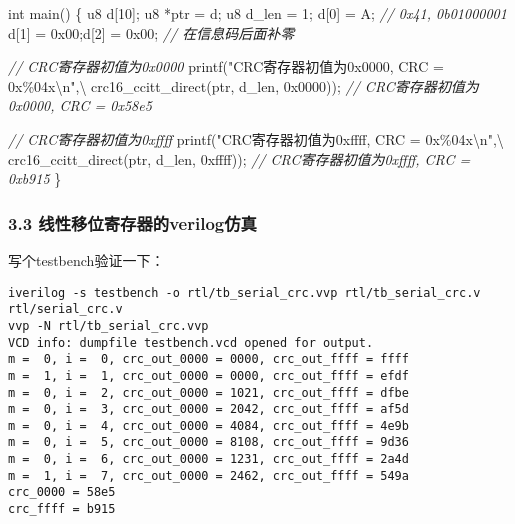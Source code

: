 \documentclass[
]{article}
\newenvironment{Shaded}{}{}
\newcommand{\BaseNTok}[1]{\textcolor[rgb]{0.25,0.63,0.44}{#1}}
\newcommand{\CharTok}[1]{\textcolor[rgb]{0.25,0.44,0.63}{#1}}
\newcommand{\CommentTok}[1]{\textcolor[rgb]{0.38,0.63,0.69}{\textit{#1}}}
\newcommand{\DataTypeTok}[1]{\textcolor[rgb]{0.56,0.13,0.00}{#1}}
\newcommand{\DecValTok}[1]{\textcolor[rgb]{0.25,0.63,0.44}{#1}}
\newcommand{\NormalTok}[1]{#1}
\newcommand{\SpecialCharTok}[1]{\textcolor[rgb]{0.25,0.44,0.63}{#1}}
\newcommand{\StringTok}[1]{\textcolor[rgb]{0.25,0.44,0.63}{#1}}
\begin{document}
\begin{Shaded}
\begin{Highlighting}[]
\DataTypeTok{int}\NormalTok{ main()}
\NormalTok{\{}
\NormalTok{	u8 d[}\DecValTok{10}\NormalTok{];}
\NormalTok{	u8 *ptr = d;}
\NormalTok{	u8 d\_len = }\DecValTok{1}\NormalTok{;}
\NormalTok{	d[}\DecValTok{0}\NormalTok{] = }\CharTok{\textquotesingle{}A\textquotesingle{}}\NormalTok{; }\CommentTok{// 0x41, 0b01000001}
\NormalTok{	d[}\DecValTok{1}\NormalTok{] = }\BaseNTok{0x00}\NormalTok{;d[}\DecValTok{2}\NormalTok{] = }\BaseNTok{0x00}\NormalTok{; }\CommentTok{// 在信息码后面补零}
	
	\CommentTok{// CRC寄存器初值为0x0000}
\NormalTok{	printf(}\StringTok{"CRC寄存器初值为0x0000, CRC = 0x\%04x}\SpecialCharTok{\textbackslash{}n}\StringTok{"}\NormalTok{,\textbackslash{}}
\NormalTok{		crc16\_ccitt\_direct(ptr, d\_len, }\BaseNTok{0x0000}\NormalTok{));}
	\CommentTok{// CRC寄存器初值为0x0000, CRC = 0x58e5 }
	
	\CommentTok{// CRC寄存器初值为0xffff}
\NormalTok{	printf(}\StringTok{"CRC寄存器初值为0xffff, CRC = 0x\%04x}\SpecialCharTok{\textbackslash{}n}\StringTok{"}\NormalTok{,\textbackslash{}}
\NormalTok{		crc16\_ccitt\_direct(ptr, d\_len, }\BaseNTok{0xffff}\NormalTok{));}
    \CommentTok{// CRC寄存器初值为0xffff, CRC = 0xb915}
\NormalTok{\}}
\end{Highlighting}
\end{Shaded}

\hypertarget{header-n168}{%
\subsubsection{3.3 线性移位寄存器的verilog仿真}\label{header-n168}}

写个testbench验证一下：

\begin{verbatim}
iverilog -s testbench -o rtl/tb_serial_crc.vvp rtl/tb_serial_crc.v rtl/serial_crc.v
vvp -N rtl/tb_serial_crc.vvp
VCD info: dumpfile testbench.vcd opened for output.
m =  0, i =  0, crc_out_0000 = 0000, crc_out_ffff = ffff
m =  1, i =  1, crc_out_0000 = 0000, crc_out_ffff = efdf
m =  0, i =  2, crc_out_0000 = 1021, crc_out_ffff = dfbe
m =  0, i =  3, crc_out_0000 = 2042, crc_out_ffff = af5d
m =  0, i =  4, crc_out_0000 = 4084, crc_out_ffff = 4e9b
m =  0, i =  5, crc_out_0000 = 8108, crc_out_ffff = 9d36
m =  0, i =  6, crc_out_0000 = 1231, crc_out_ffff = 2a4d
m =  1, i =  7, crc_out_0000 = 2462, crc_out_ffff = 549a
crc_0000 = 58e5
crc_ffff = b915
\end{verbatim}
\end{document}
